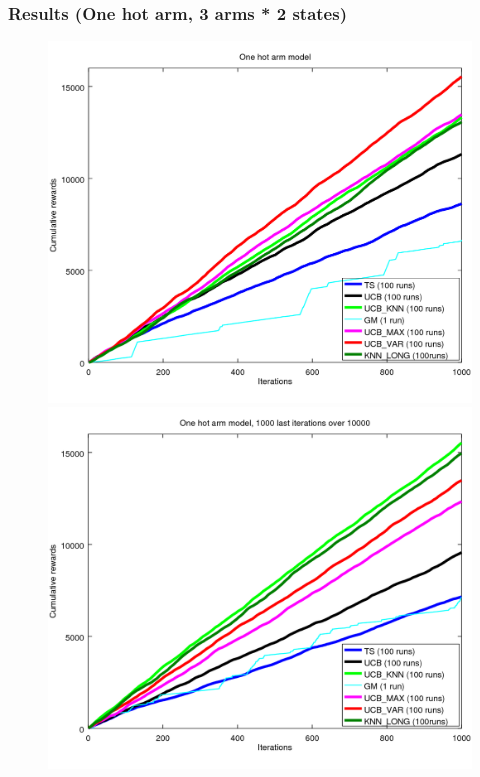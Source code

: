 \documentclass[french]{beamer}
\begin{document}
\begin{frame}
	\frametitle{Results (One hot arm, 3 arms * 2 states)}	
	\begin{figure}[h]
		\begin{minipage}[b]{.49\linewidth}
			\includegraphics[width=1.0\textwidth]{begin_1000it.png}
			
		\end{minipage}
		\hfill
		\begin{minipage}[b]{0.49\linewidth}
			\includegraphics[width=1.0\textwidth]{last_1000it.png}
			
		\end{minipage}
		\label{fig:f}
	\end{figure}
	
\end{frame}
\end{document}
